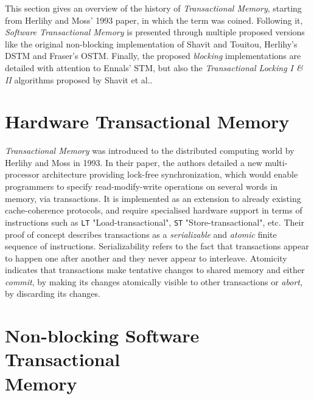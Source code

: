 This section gives an overview of the history of \textit{Transactional Memory}, starting from Herlihy and Moss' 1993 paper, in which the term was coined\cite{herlihy-moss}. Following it, \textit{Software Transactional Memory} is presented through multiple proposed versions like the original non-blocking implementation of Shavit and Touitou\cite{shavit-stm}, Herlihy's DSTM\cite{DSTM} and Fraser's OSTM\cite{OSTM, ostm2}. Finally, the proposed \textit{blocking} implementations are detailed with attention to Ennals' STM\cite{ennals-stm}, but also the \textit{Transactional Locking I \& II} algorithms proposed by Shavit et al.\cite{tl, tl2}.

\section{Hardware Transactional Memory}

\textit{Transactional Memory} was introduced to the distributed computing world by Herlihy and Moss in 1993\cite{herlihy-moss}. In their paper, the authors detailed a new multi-processor architecture providing lock-free synchronization, which would enable programmers to specify read-modify-write operations on several words in memory, via transactions. It is implemented as an extension to already existing cache-coherence protocols, and require specialised hardware support in terms of instructions such as \texttt{LT} "Load-transactional", \texttt{ST} "Store-transactional", etc\cite{herlihy-moss}. Their proof of concept describes transactions as a \textit{serializable} and \textit{atomic} finite sequence of instructions. Serializability refers to the fact that transactions appear to happen one after another and they never appear to interleave. Atomicity indicates that transactions make tentative changes to shared memory and either \textit{commit}, by making its changes atomically visible to other transactions or \textit{abort}, by discarding its changes\cite{herlihy-moss}.\par

\section[Non-blocking Software Transactional Memory]{Non-blocking Software Transactional\\Memory}

